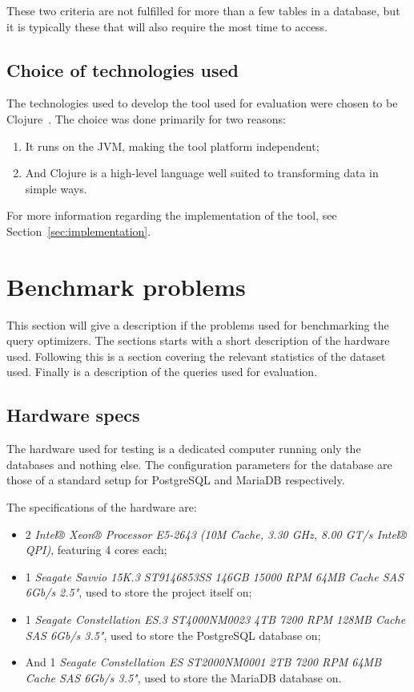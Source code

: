 These two criteria are not fulfilled for more than a few tables in a database,
but it is typically these that will also require the most time to access.

\subsection{Choice of technologies used}
The technologies used to develop the tool used for evaluation were chosen to be
Clojure~\cite{clojure_c}. The choice was done primarily for two reasons:
\begin{enumerate}
\item It runs on the JVM, making the tool platform independent;
\item And Clojure is a high-level language well suited to transforming data in
  simple ways.
\end{enumerate}

For more information regarding the implementation of the tool, see
Section~\ref{sec:implementation}.

\section{Benchmark problems}\label{sec:benchmark}
This section will give a description if the problems used for benchmarking the
query optimizers. The sections starts with a short description of the hardware
used. Following this is a section covering the relevant statistics of the
dataset used. Finally is a description of the queries used for evaluation.

\subsection{Hardware specs}
The hardware used for testing is a dedicated computer running only the databases
and nothing else. The configuration parameters for the database are those of a
standard setup for PostgreSQL and MariaDB respectively.

The specifications of the hardware are:
\begin{itemize}
\item 2 \textit{Intel® Xeon® Processor E5-2643 (10M Cache, 3.30 GHz, 8.00 GT/s Intel®
    QPI)}, featuring 4 cores each;
\item 1 \textit{Seagate Savvio 15K.3 ST9146853SS 146GB 15000 RPM 64MB Cache SAS 6Gb/s
    2.5"}, used to store the project itself on;
\item 1 \textit{Seagate Constellation ES.3 ST4000NM0023 4TB 7200 RPM 128MB Cache SAS
    6Gb/s 3.5"}, used to store the PostgreSQL database on;
\item And 1 \textit{Seagate Constellation ES ST2000NM0001 2TB 7200 RPM 64MB Cache SAS 6Gb/s
    3.5"}, used to store the MariaDB database on.
\end{itemize}


